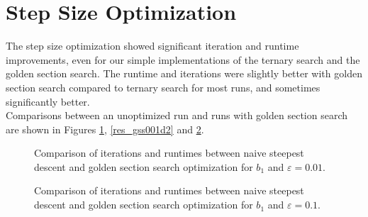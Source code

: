 \section{Step Size Optimization}
The step size optimization showed significant iteration and runtime improvements, even for our simple implementations of the ternary search and the golden section search. The runtime and iterations were slightly better with golden section search compared to ternary search for most runs, and sometimes significantly better.\\
Comparisons between an unoptimized run and runs with golden section search are shown in Figures \ref{res_gss001d1}, \ref{res_gss001d2} and \ref{res_gss01d1}.
\begin{figure}
\begin{center}
\end{center}
\caption{Comparison of iterations and runtimes between naive steepest descent and golden section search optimization for $b_1$ and $\varepsilon=0.01$.}\label{res_gss001d1}
\end{figure}
\begin{figure}
\begin{center}
\end{center}
\caption{Comparison of iterations and runtimes between naive steepest descent and golden section search optimization for $b_1$ and $\varepsilon=0.1$.}\label{res_gss01d1}
\end{figure}
